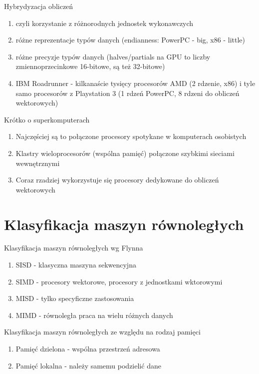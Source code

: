 \documentclass{beamer}
\begin{document}
\begin{frame}{Hybrydyzacja obliczeń}
  \begin{enumerate}
  \item czyli korzystanie z różnorodnych jednostek wykonawczych
  \item różne reprezentacje typów danych (endianness: PowerPC - big, x86 - little)
  \item różne precyzje typów danych (halves/partials na GPU to liczby zmiennoprzecinkowe 16-bitowe, są też 32-bitowe)
  \item IBM Roadrunner - kilkanaście tysięcy procesorów AMD (2 rdzenie, x86) i tyle samo procesorów z Playstation 3 (1 rdzeń PowerPC, 8 rdzeni do obliczeń wektorowych)
  \end{enumerate}
\end{frame}

\begin{frame}{Krótko o superkomputerach}
  \begin{enumerate}
  \item Najczęściej są to połączone procesory spotykane w komputerach osobistych
  \item Klastry wieloprocesorów (wspólna pamięć) połączone szybkimi sieciami wewnętrznymi
  \item Coraz rzadziej wykorzystuje się procesory dedykowane do obliczeń wektorowych
  \end{enumerate}
\end{frame}

\section{Klasyfikacja maszyn równoległych}

\begin{frame}{Klasyfikacja maszyn równoległych wg Flynna}
  \begin{enumerate}
  \item SISD - klasyczna maszyna sekwencyjna
  \item SIMD - procesory wektorowe, procesory z jednostkami wktorowymi
  \item MISD - tylko specyficzne zastosowania
  \item MIMD - równoległa praca na wielu różnych danych
  \end{enumerate}
\end{frame}

\begin{frame}{Klasyfikacja maszyn równoległych ze względu na rodzaj pamięci}
  \begin{enumerate}
  \item Pamięć dzielona - wspólna przestrzeń adresowa
  \item Pamięć lokalna - należy samemu podzielić dane
  \end{enumerate}
\end{frame}
\end{document}
